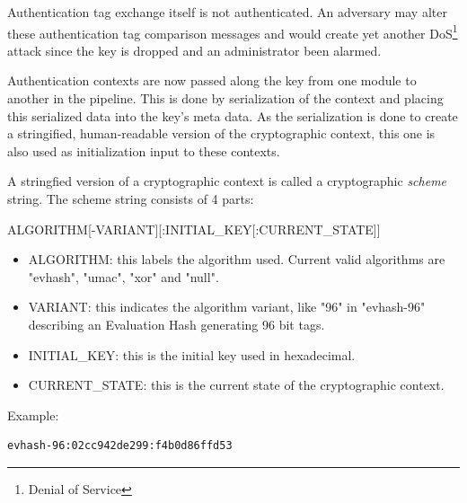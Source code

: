 Authentication tag exchange itself is not authenticated. An adversary may alter these authentication tag comparison messages and would create yet another DoS\footnote{Denial of Service} attack since the key is dropped and an administrator been alarmed.

\medskip

Authentication contexts are now passed along the key from one module to another in the pipeline. This is done by serialization of the context and placing this serialized data into the key's meta data. As the serialization is done to create a stringified, human-readable version of the cryptographic context, this one is also used as initialization input to these contexts.

\medskip

A stringfied version of a cryptographic context is called a cryptographic \emph{scheme} string. The scheme string consists of 4 parts:

\medskip

\begin{center}
ALGORITHM[-VARIANT][:INITIAL\_KEY[:CURRENT\_STATE]]
\end{center}

\medskip

\begin{itemize}

\item{ALGORITHM}: this labels the algorithm used. Current valid algorithms are "evhash", "umac", "xor" and "null".

\item{VARIANT}: this indicates the algorithm variant, like "96" in "evhash-96" describing an Evaluation Hash generating 96 bit tags.

\item{INITIAL\_KEY}: this is the initial key used in hexadecimal.

\item{CURRENT\_STATE}: this is the current state of the cryptographic context.

\end{itemize}

\medskip

\noindent Example:

\begin{minipage}{0.9\textwidth}
\bigskip
\begin{verbatim}
evhash-96:02cc942de299:f4b0d86ffd53
\end{verbatim}
\medskip
\end{minipage}

